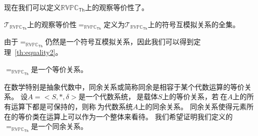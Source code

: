 现在我们可以定义$\mathbb{RVPC}_{\mathsf{Th}}$上的观察等价性了。
\begin{definition}
   $\mathcal{T}_{\mathbb{RVPC}_{\mathsf{Th}}}$上的观察等价性$=_{\mathbb{RVPC}_{\mathsf{Th}}}$定义为$\mathcal{T}_{\mathbb{RVPC}_{\mathsf{Th}}}$上的符号互模拟关系的全集。
\end{definition}
由于$=_{\mathbb{RVPC}_{\mathsf{Th}}}$仍然是一个符号互模拟关系，因此我们可以得到定理~\ref{th:equality2}。
\begin{theorem}\label{th:equality2}
   $=_{\mathbb{RVPC}_{\mathsf{Th}}}$是一个等价关系。
\end{theorem}

在数学特别是抽象代数中，同余关系或简称同余是相容于某个代数运算的等价关系。
设$A=<S,*,\delta>$是一个代数系统，$~$是载体$S$上的等价关系，若$~$在$A$上的所有运算下都是可保持的，则称$~$为代数系统$A$上的同余关系。 
同余关系使得元素所在的等价类在运算上可以作为一个整体来看待。
我们希望证明我们定义的$=_{\mathbb{RVPC}_{\mathsf{Th}}}$是一个同余关系。

